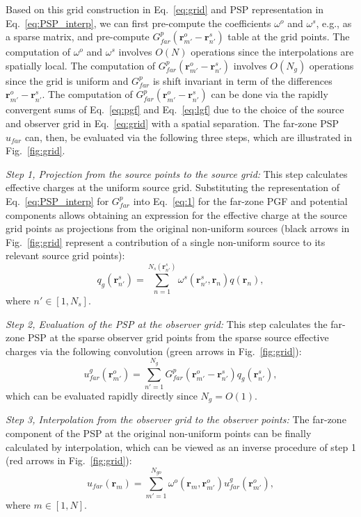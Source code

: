 \documentclass{article}
\begin{document}
Based on this grid construction in Eq.~\eqref{eq:grid} and PSP representation in Eq.~\eqref{eq:PSP_interp}, we can first pre-compute the coefficients $\omega^o$ and $\omega^s$, e.g., as a sparse matrix, and pre-compute $G^p_{far}(\mathbf{r}_{m'}^o - \mathbf{r}_{n'}^s)$ table at the grid points. The computation of $\omega^o$ and $\omega^s$ involves $O(N)$ operations since the interpolations are spatially local. The computation of $G^p_{far}(\mathbf{r}_{m'}^o-\mathbf{r}_{n'}^s)$ involves $O(N_g)$ operations since the grid is uniform and $G^p_{far}$ is shift invariant in term of the differences $\mathbf{r}_{m'}^o-\mathbf{r}_{n'}^s$. The computation of $G^p_{far}(\mathbf{r}_{m'}^o-\mathbf{r}_{n'}^s)$ can be done via the rapidly convergent sums of Eq.~\eqref{eq:pgf} and Eq.~\eqref{eq:lgf} due to the choice of the source and observer grid in Eq.~\eqref{eq:grid} with a spatial separation. The far-zone PSP $u_{far}$ can, then, be evaluated via the following three steps, which are illustrated in Fig.~\ref{fig:grid}.

\textit{Step 1, Projection from the source points to the source grid:}
This step calculates effective charges at the uniform source grid. Substituting the representation of Eq.~\eqref{eq:PSP_interp} for $G^p_{far}$ into Eq.~\eqref{eq:1} for the far-zone PGF and potential components allows obtaining an expression for the effective charge at the source grid points as projections from the original non-uniform sources (black arrows in Fig.~\ref{fig:grid} represent a contribution of a single non-uniform source to its relevant source grid points):
\begin{equation} \label{eq:projection}
q_g(\mathbf{r}_{n'}^s)=\sum_{n=1}^{N_{s}(\mathbf{r}_{n'}^s)}\omega^s(\mathbf{r}_{n'}^s,\mathbf{r}_{n})q(\mathbf{r}_n),
\end{equation}
where $n'\in [1, N_s]$. 

\textit{Step 2, Evaluation of the PSP at the observer grid:} 
This step calculates the far-zone PSP at the sparse observer grid points from the sparse source effective charges via the following convolution (green arrows in Fig.~\ref{fig:grid}):
\begin{equation}\label{eq:8}
    u_{far}^g({\mathbf{r}_{m'}^o})=\sum_{n'=1}^{N_g}G^p_{far}(\mathbf{r}_{m'}^o-\mathbf{r}_{n'}^s)q_g(\mathbf{r}_{n'}^s),
\end{equation}
which can be evaluated rapidly directly since $N_g=O(1)$.

\textit{Step 3, Interpolation from the observer grid to the observer points:}
The far-zone component of the PSP at the original non-uniform points can be finally calculated by interpolation, which can be viewed as an inverse procedure of step 1 (red arrows in Fig.~\ref{fig:grid}):
\begin{equation}\label{eq:interpolation}
    u_{far}(\mathbf{r}_m)=\sum_{m'=1}^{N_{go}}\omega^o(\mathbf{r}_{m}, \mathbf{r}_{m'}^o)u_{far}^g(\mathbf{r}_{m'}^o),
\end{equation}
where $m\in[1, N]$.
\end{document}
